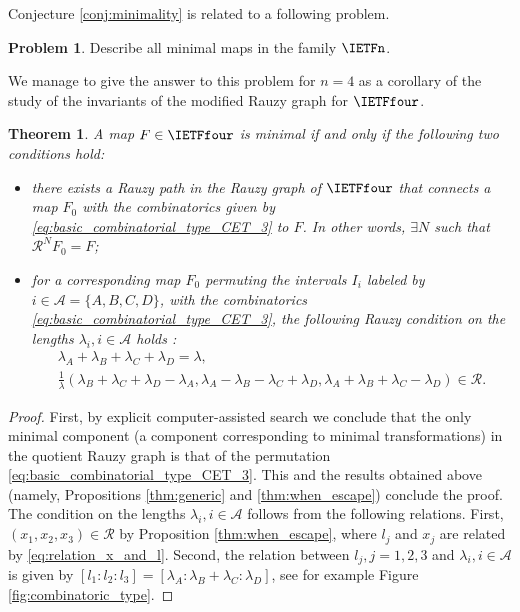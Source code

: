 \documentclass[12pt]{article}
\newtheorem{theorem}{Theorem}
\theoremstyle{definition}
\newtheorem*{problem}{Problem}
\begin{document}
Conjecture \ref{conj:minimality} is related to a following problem.

\begin{problem}
Describe all minimal maps in the family $\IETFn$.
\end{problem}


\smallskip

We manage to give the answer to this problem for $n=4$ as a corollary of the study of the invariants of the modified Rauzy graph for $\IETFfour$.

\begin{theorem}
A map $F \in \IETFfour$ is minimal if and only if the following two conditions hold:
\begin{itemize}
\item[1.] there exists a Rauzy path in the Rauzy graph of $\IETFfour$ that connects a map $F_0$ with the combinatorics given by \eqref{eq:basic_combinatorial_type_CET_3} to $F$. In other words, $\exists N$ such that $\mathcal{R}^N F_0 = F$;
\item[2.] for a corresponding map $F_0$ permuting the intervals $I_i$ labeled by $i \in \mathcal{A}=\{A,B,C,D\}$, with the combinatorics \eqref{eq:basic_combinatorial_type_CET_3}, the following Rauzy condition on the lengths $\lambda_i, i \in \mathcal{A}$ holds :
\begin{align*}
\lambda_A+\lambda_B+\lambda_C+\lambda_D=\lambda,\\
\frac{1}{\lambda}\left(
\lambda_B+\lambda_C+\lambda_D-\lambda_A, \lambda_A-\lambda_B-\lambda_C+\lambda_D, \lambda_A+\lambda_B+\lambda_C-\lambda_D
\right)\in \boldsymbol{\mathcal{R}}.
\end{align*}
\end{itemize}
\end{theorem}

\begin{proof}
 First, by explicit computer-assisted search we conclude that the only minimal component (a component corresponding to minimal transformations) in the quotient Rauzy graph is that of the permutation \eqref{eq:basic_combinatorial_type_CET_3}. This and the results obtained above (namely, Propositions \ref{thm:generic} and \ref{thm:when_escape}) conclude the proof. The condition on the lengths $\lambda_i, i \in \mathcal{A}$ follows from the following relations. First, $(x_1,x_2,x_3) \in \boldsymbol{\mathcal{R}}$ by Proposition \ref{thm:when_escape}, where $l_j$ and $x_j$ are related by \eqref{eq:relation_x_and_l}. Second, the relation between $l_j, j=1,2,3$ and $\lambda_i, i \in \mathcal{A}$ is given by $[l_1:l_2:l_3]=[\lambda_A: \lambda_B+\lambda_C: \lambda_D]$, see for example Figure \ref{fig:combinatoric_type}.
\end{proof}
\end{document}
